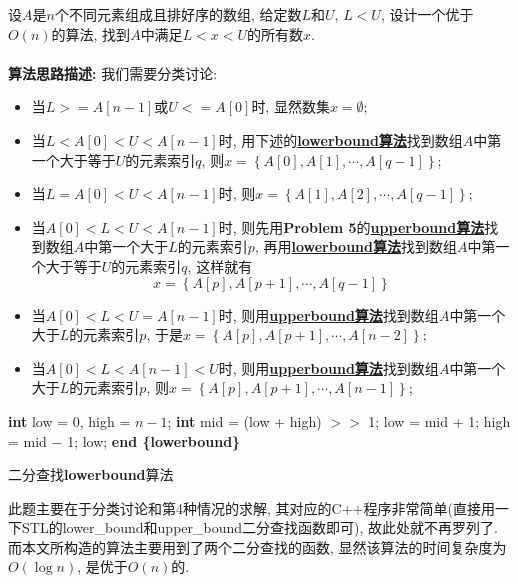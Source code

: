 \documentclass{article}
\begin{document}
\begin{homeworkProblem}

	设$A$是$n$个不同元素组成且排好序的数组, 给定数$L$和$U$, $L<U$, 设计一个优于$O(n)$的算法, 找到$A$中满足$L<x<U$的所有数$x$.
	\\

	\solution
	\\

	\textbf{算法思路描述:} 我们需要分类讨论:
	\begin{itemize}
		\item 当$L>=A[n-1]$或$U<=A[0]$时, 显然数集$x=\emptyset$;
		\item 当$L<A[0]<U<A[n-1]$时, 用下述的\hyperref[alg:lowerbound算法]{\textbf{lowerbound算法}}找到数组$A$中第一个大于等于$U$的元素索引$q$, 则$x=\left\{ A\left[ 0 \right] ,A\left[ 1 \right] ,\cdots ,A\left[ q-1 \right] \right\}$; 
		\item 当$L=A[0]<U<A[n-1]$时, 则$x=\left\{ A\left[ 1 \right] ,A\left[ 2 \right] ,\cdots ,A\left[ q-1 \right] \right\}$;
		\item 当$A[0]<L<U<A[n-1]$时, 则先用\textbf{Problem 5}的\hyperref[alg:upperbound算法]{\textbf{upperbound算法}}找到数组$A$中第一个大于$L$的元素索引$p$, 再用\hyperref[alg:lowerbound算法]{\textbf{lowerbound算法}}找到数组$A$中第一个大于等于$U$的元素索引$q$, 这样就有$$x=\left\{ A\left[ p \right] ,A\left[ p+1 \right] ,\cdots ,A\left[ q-1 \right] \right\}$$
		\item 当$A\left[ 0 \right] <L<U=A\left[ n-1 \right] $时, 则用\hyperref[alg:upperbound算法]{\textbf{upperbound算法}}找到数组$A$中第一个大于$L$的元素索引$p$, 于是$x=\left\{ A\left[ p \right] ,A\left[ p+1 \right] ,\cdots ,A\left[ n-2 \right] \right\}$;
		\item 当$A\left[ 0 \right] <L<A\left[ n-1 \right] <U$时, 则用\hyperref[alg:upperbound算法]{\textbf{upperbound算法}}找到数组$A$中第一个大于$L$的元素索引$p$, 则$x=\left\{ A\left[ p \right] ,A\left[ p+1 \right] ,\cdots ,A\left[ n-1 \right] \right\}$;
	\end{itemize}
	  

	\begin{algorithm}[H]
		\begin{algorithmic}[1]
		\State \textbf{int} low = 0, high = $n - 1$;
			\State \textbf{int} mid = (low + high) $>>$ 1;
				\State low = mid + 1;
			\Else
				\State high = mid $-$ 1;
			\EndIf
		\EndWhile
		\State \Return low; 
		\State \textbf{end \{lowerbound\}}
		\end{algorithmic}
		\caption{二分查找\textbf{lowerbound}算法}
		\label{alg:lowerbound算法}
	\end{algorithm}
	此题主要在于分类讨论和第4种情况的求解, 其对应的C++程序非常简单(直接用一下STL的lower_bound和upper_bound二分查找函数即可), 故此处就不再罗列了. 而本文所构造的算法主要用到了两个二分查找的函数, 显然该算法的时间复杂度为$O(\log n)$, 是优于$O(n)$的.
\end{homeworkProblem}
\end{document}
